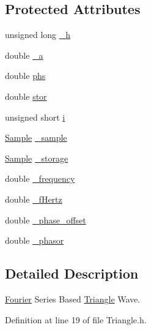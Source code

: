 \subsection*{Protected Attributes}
\begin{DoxyCompactItemize}
\item 
unsigned long \hyperlink{classSignal_1_1Fourier_1_1Triangle_a0d987dff01447373147446f729357df0}{\+\_\+h}
\item 
double \hyperlink{classSignal_1_1Fourier_1_1Triangle_a73f0f6403d3b0b597f9c7686c22555f6}{\+\_\+a}
\item 
double \hyperlink{classSignal_1_1Fourier_1_1Triangle_a5a6c140fe0bc67cb34676c8cec1206d8}{phs}
\item 
double \hyperlink{classSignal_1_1Fourier_1_1Triangle_ac83be9f42f0e0f497cca36b26cbd5c02}{stor}
\item 
unsigned short \hyperlink{classSignal_1_1Fourier_1_1Triangle_a08b51bfe6697483ed00af4d41e1e66f2}{i}
\item 
\hyperlink{classSignal_1_1Sample}{Sample} \hyperlink{classSignal_1_1Fourier_1_1FourierGenerator_ad720bf2b268dc621ace64c54c0816597}{\+\_\+sample}
\item 
\hyperlink{classSignal_1_1Sample}{Sample} \hyperlink{classSignal_1_1Fourier_1_1FourierGenerator_ab6e6b79cf56e31c9a1b5766f357f8cfb}{\+\_\+storage}
\item 
double \hyperlink{classSignal_1_1SignalGenerator_a7f107461333bce68c5dad412db96a8c2}{\+\_\+frequency}
\item 
double \hyperlink{classSignal_1_1SignalGenerator_a85a4702347352bab1c71e0a8df8437d6}{\+\_\+f\+Hertz}
\item 
double \hyperlink{classSignal_1_1SignalGenerator_a6b4444d46747c8517171edbbf4b5588f}{\+\_\+phase\+\_\+offset}
\item 
double \hyperlink{classSignal_1_1SignalGenerator_af4aa0728ded00777be26a06d883eaeb3}{\+\_\+phasor}
\end{DoxyCompactItemize}


\subsection{Detailed Description}
\hyperlink{namespaceSignal_1_1Fourier}{Fourier} Series Based \hyperlink{classSignal_1_1Fourier_1_1Triangle}{Triangle} Wave. 

Definition at line 19 of file Triangle.\+h.



